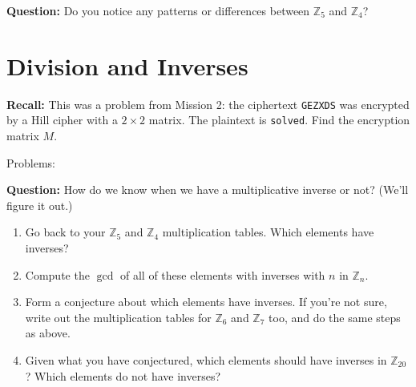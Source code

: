 \documentclass[12pt]{amsart}
\theoremstyle{plain}
\theoremstyle{definition}
\theoremstyle{remark}
\begin{document}
\noindent \textbf{Question:} Do you notice any patterns or differences between  $\mathbb{Z}_5$ and  $\mathbb{Z}_4$?\\
\vspace{2in}

\newpage \section{Division and Inverses}

\noindent \textbf{Recall:} This was a problem from Mission 2: the ciphertext \texttt{GEZXDS} was encrypted by a Hill cipher with a $2 \times 2$ matrix.  The plaintext is \texttt{solved}.  Find the encryption matrix $M$.
	
	Problems:
	\vspace{4in}
	
\noindent \textbf{Question:} How do we know when we have a multiplicative inverse or not?  (We'll figure it out.)

	\begin{enumerate}[1.]
	\item Go back to your $\mathbb{Z}_5$ and $\mathbb{Z}_4$ multiplication tables.  Which elements have inverses?
	\vspace{1.5in}	
	
	\newpage \item Compute the $\gcd$ of all of these elements with inverses with $n$ in $\mathbb{Z}_n$.\\ \vspace{2in}
	
	\item Form a conjecture about which elements have inverses.  If you're not sure, write out the multiplication tables for $\mathbb{Z}_6$ and $\mathbb{Z}_7$ too, and do the same steps as above.\\ \vspace{2.5in}
	
	\item Given what you have conjectured, which elements should have inverses in $\mathbb{Z}_{20}$?  Which elements do not have inverses?
\end{enumerate}
\end{document}
